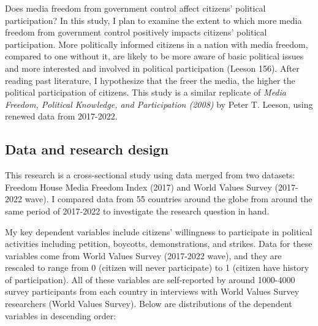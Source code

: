 \documentclass[
]{article}
\begin{document}
Does media freedom from government control affect citizens' political
participation? In this study, I plan to examine the extent to which more
media freedom from government control positively impacts citizens'
political participation. More politically informed citizens in a nation
with media freedom, compared to one without it, are likely to be more
aware of basic political issues and more interested and involved in
political participation (Leeson 156). After reading past literature, I
hypothesize that the freer the media, the higher the political
participation of citizens. This study is a similar replicate of
\emph{Media Freedom, Political Knowledge, and Participation (2008)} by
Peter T. Leeson, using renewed data from 2017-2022.

\hypertarget{data-and-research-design}{%
\subsection{Data and research design}\label{data-and-research-design}}

This research is a cross-sectional study using data merged from two
datasets: Freedom House Media Freedom Index (2017) and World Values
Survey (2017-2022 wave). I compared data from 55 countries around the
globe from around the same period of 2017-2022 to investigate the
research question in hand.

My key dependent variables include citizens' willingness to participate
in political activities including petition, boycotts, demonstrations,
and strikes. Data for these variables come from World Values Survey
(2017-2022 wave), and they are rescaled to range from 0 (citizen will
never participate) to 1 (citizen have history of participation). All of
these variables are self-reported by around 1000-4000 survey
participants from each country in interviews with World Values Survey
researchers (World Values Survey). Below are distributions of the
dependent variables in descending order:
\end{document}
